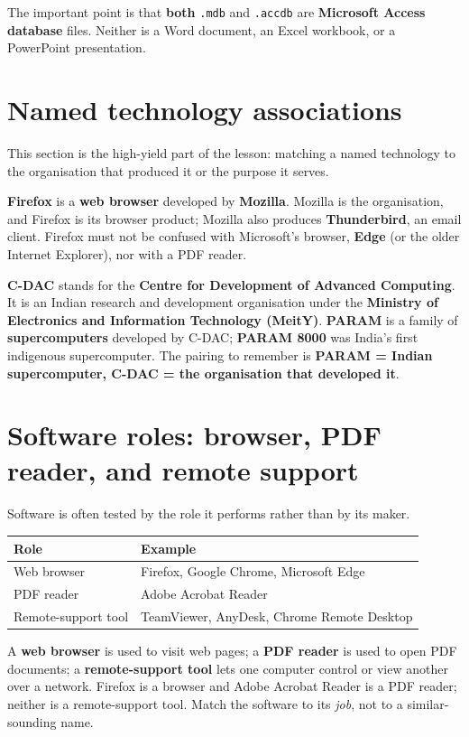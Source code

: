 The important point is that \textbf{both} \texttt{.mdb} and \texttt{.accdb}
are \textbf{Microsoft Access database} files. Neither is a Word document, an
Excel workbook, or a PowerPoint presentation.

\section{Named technology associations}
This section is the high-yield part of the lesson: matching a named
technology to the organisation that produced it or the purpose it serves.

\textbf{Firefox} is a \textbf{web browser} developed by \textbf{Mozilla}.
Mozilla is the organisation, and Firefox is its browser product; Mozilla also
produces \textbf{Thunderbird}, an email client. Firefox must not be confused
with Microsoft's browser, \textbf{Edge} (or the older Internet Explorer), nor
with a PDF reader.

\textbf{C-DAC} stands for the \textbf{Centre for Development of Advanced
Computing}. It is an Indian research and development organisation under the
\textbf{Ministry of Electronics and Information Technology (MeitY)}.
\textbf{PARAM} is a family of \textbf{supercomputers} developed by C-DAC;
\textbf{PARAM 8000} was India's first indigenous supercomputer. The pairing
to remember is \textbf{PARAM = Indian supercomputer, C-DAC = the organisation
that developed it}.

\section{Software roles: browser, PDF reader, and remote support}
Software is often tested by the role it performs rather than by its maker.

\begin{center}
\begin{tabular}{p{}p{}}
\toprule
\textbf{Role} & \textbf{Example} \\
\midrule
Web browser & Firefox, Google Chrome, Microsoft Edge \\
PDF reader & Adobe Acrobat Reader \\
Remote-support tool & TeamViewer, AnyDesk, Chrome Remote Desktop \\
\bottomrule
\end{tabular}
\end{center}

A \textbf{web browser} is used to visit web pages; a \textbf{PDF reader} is
used to open PDF documents; a \textbf{remote-support tool} lets one computer
control or view another over a network. Firefox is a browser and Adobe
Acrobat Reader is a PDF reader; neither is a remote-support tool. Match the
software to its \emph{job}, not to a similar-sounding name.

